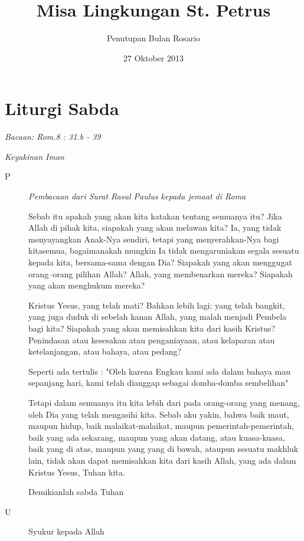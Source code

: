 \documentclass[12pt,a4paper]{article}
\author{Penutupan Bulan Rosario}
\title{Misa Lingkungan St. Petrus}
\date{27 Oktober 2013 }
\begin{document}
\maketitle
\section*{Liturgi Sabda}
\textit{Bacaan: Rom.8 : 31.b - 39}

\textit{Keyakinan Iman}

\begin{description}
\item [P] \textit{Pembacaan dari Surat Rasul Paulus kepada jemaat di Roma }

      Sebab itu apakah yang akan kita katakan tentang semuanya itu? Jika Allah di pihak kita, siapakah yang akan melawan kita? Ia, yang tidak menyayangkan Anak-Nya sendiri, tetapi yang menyerahkan-Nya bagi kitasemua, bagaimanakah mungkin Ia tidak mengaruniakan segala sesuatu kepada kita, bersama-sama dengan Dia? Siapakah yang akan menggugat orang--orang pilihan Allah? Allah, yang membenarkan mereka? Siapakah yang akan menghukum mereka? 

 Kristus Yesus, yang telah mati? Bahkan lebih lagi: yang telah bangkit, yang juga duduk  di sebelah kanan Allah, yang malah menjadi Pembela bagi kita? Siapakah yang akan memisahkan kita dari kasih Kristus? Penindasan atau kesesakan atau penganiayaan, atau kelaparan atau ketelanjangan, atau bahaya, atau pedang? 
      
      Seperti ada tertulis :
"Oleh karena Engkau kami ada dalam bahaya mau sepanjang hari, kami telah dianggap sebagai domba-domba sembelihan"
 
  Tetapi dalam semuanya itu kita lebih dari pada orang-orang yang menang, oleh Dia yang telah mengasihi kita. Sebab aku yakin, bahwa baik maut, maupun hidup, baik malaikat-malaikat, maupun pemerintah-pemerintah, baik yang ada sekarang, maupun yang akan datang, atau kuasa-kuasa, baik yang di atas, maupun yang yang di bawah, ataupun sesuatu makhluk lain, tidak akan dapat memisahkan kita dari kasih Allah, yang ada dalam Kristus Yesus, Tuhan kita.

       Demikianlah sabda Tuhan

\item [U] Syukur kepada Allah 
\end{description}
\end{document}
